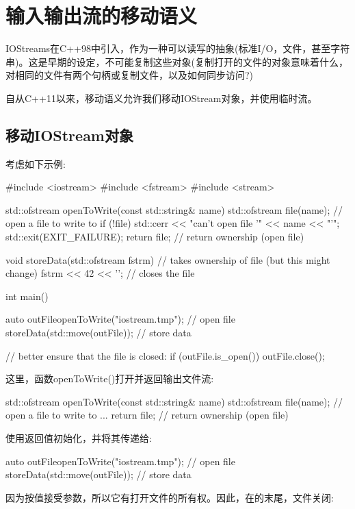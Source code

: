 \section{输入输出流的移动语义}
IOStreams在C++98中引入，作为一种可以读写的抽象(标准I/O，文件，甚至字符串)。这是早期的设定，不可能复制这些对象(复制打开的文件的对象意味着什么，对相同的文件有两个句柄或复制文件，以及如何同步访问?)

自从C++11以来，移动语义允许我们移动IOStream对象，并使用临时流。

\subsection{移动IOStream对象}

考虑如下示例:

\begin{cppcode}
#include <iostream>
#include <fstream>
#include <stream>

std::ofstream openToWrite(const std::string& name)
{
	std::ofstream file(name); // open a file to write to
	if (!file) {
		std::cerr << "can't open file '" << name << "'\n";
		std::exit(EXIT_FAILURE);
	}
	return file; // return ownership (open file)
}

void storeData(std::ofstream fstrm) // takes ownership of file (but this might change)
{
	fstrm << 42 << '\n';
} // closes the file

int main()
{
	auto outFile{openToWrite("iostream.tmp")}; // open file
	storeData(std::move(outFile)); // store data

	// better ensure that the file is closed:
	if (outFile.is_open()) {
		outFile.close();
	}
}
\end{cppcode}

这里，函数openToWrite()打开并返回输出文件流:

\begin{cppcode}
std::ofstream openToWrite(const std::string& name)
{
	std::ofstream file(name); // open a file to write to
	...
	return file; // return ownership (open file)
}
\end{cppcode}

使用返回值初始化，并将其传递给:

\begin{cppcode}
auto outFile{openToWrite("iostream.tmp")}; // open file
storeData(std::move(outFile)); // store data
\end{cppcode}

因为按值接受参数，所以它有打开文件的所有权。因此，在的末尾，文件关闭:

